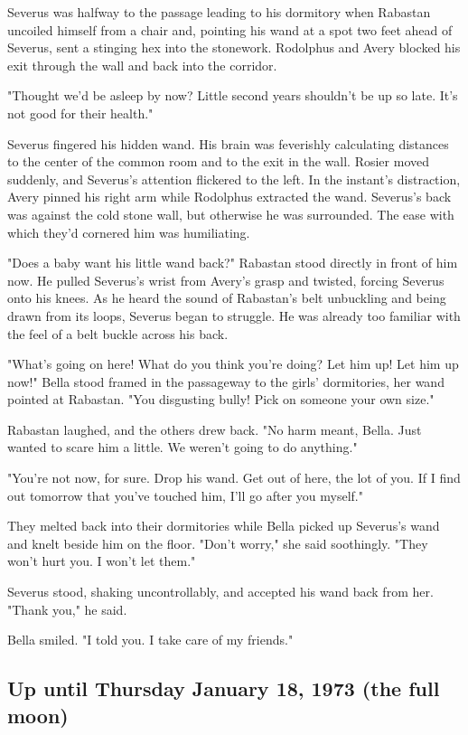 Severus was halfway to the passage leading to his dormitory when Rabastan uncoiled himself from a chair and, pointing his wand at a spot two feet ahead of Severus, sent a stinging hex into the stonework. Rodolphus and Avery blocked his exit through the wall and back into the corridor.

"Thought we'd be asleep by now? Little second years shouldn't be up so late. It's not good for their health."

Severus fingered his hidden wand. His brain was feverishly calculating distances to the center of the common room and to the exit in the wall. Rosier moved suddenly, and Severus's attention flickered to the left. In the instant's distraction, Avery pinned his right arm while Rodolphus extracted the wand. Severus's back was against the cold stone wall, but otherwise he was surrounded. The ease with which they'd cornered him was humiliating.

"Does a baby want his little wand back?" Rabastan stood directly in front of him now. He pulled Severus's wrist from Avery's grasp and twisted, forcing Severus onto his knees. As he heard the sound of Rabastan's belt unbuckling and being drawn from its loops, Severus began to struggle. He was already too familiar with the feel of a belt buckle across his back.

"What's going on here! What do you think you're doing? Let him up! Let him up now!" Bella stood framed in the passageway to the girls' dormitories, her wand pointed at Rabastan. "You disgusting bully! Pick on someone your own size."

Rabastan laughed, and the others drew back. "No harm meant, Bella. Just wanted to scare him a little. We weren't going to do anything."

"You're not now, for sure. Drop his wand. Get out of here, the lot of you. If I find out tomorrow that you've touched him, I'll go after you myself."

They melted back into their dormitories while Bella picked up Severus's wand and knelt beside him on the floor. "Don't worry," she said soothingly. "They won't hurt you. I won't let them."

Severus stood, shaking uncontrollably, and accepted his wand back from her. "Thank you," he said.

Bella smiled. "I told you. I take care of my friends."

\subsection{Up until Thursday January 18, 1973 (the full moon)}


